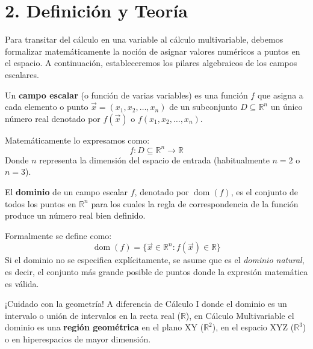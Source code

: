 \documentclass[11pt]{article}
\newenvironment{teoria}{%
  \section*{2. Definición y Teoría}%
}{}
\newenvironment{definicion}[1]{%
  \begin{tcolorbox}[colback=blue!5,colframe=blue!75!black,title=Definición: #1]%
}{%
  \end{tcolorbox}%
}
\newenvironment{alerta}[1]{%
  \begin{tcolorbox}[colback=yellow!10,colframe=orange!80!black,title=Alerta: #1]%
}{%
  \end{tcolorbox}%
}
\begin{document}
\begin{teoria}
  Para transitar del cálculo en una variable al cálculo multivariable, debemos formalizar matemáticamente la noción de asignar valores numéricos a puntos en el espacio. A continuación, estableceremos los pilares algebraicos de los campos escalares.

  \begin{definicion}{Campo Escalar}
    Un \textbf{campo escalar} (o función de varias variables) es una función $f$ que asigna a cada elemento o punto $\vec{x} = (x_1, x_2, \dots, x_n)$ de un subconjunto $D \subseteq \mathbb{R}^n$ un único número real denotado por $f(\vec{x})$ o $f(x_1, x_2, \dots, x_n)$.
    
    Matemáticamente lo expresamos como:
    $$ f \colon D \subseteq \mathbb{R}^n \to \mathbb{R} $$
    Donde $n$ representa la dimensión del espacio de entrada (habitualmente $n=2$ o $n=3$).
  \end{definicion}

  \begin{definicion}{Dominio de un Campo Escalar}
    El \textbf{dominio} de un campo escalar $f$, denotado por $\operatorname{dom}(f)$, es el conjunto de todos los puntos en $\mathbb{R}^n$ para los cuales la regla de correspondencia de la función produce un número real bien definido. 
    
    Formalmente se define como:
    $$ \operatorname{dom}(f) = \{ \vec{x} \in \mathbb{R}^n \colon f(\vec{x}) \in \mathbb{R} \} $$
    Si el dominio no se especifica explícitamente, se asume que es el \textit{dominio natural}, es decir, el conjunto más grande posible de puntos donde la expresión matemática es válida.
  \end{definicion}

  \begin{alerta}{Visualización del Dominio}
    ¡Cuidado con la geometría! A diferencia de Cálculo I donde el dominio es un intervalo o unión de intervalos en la recta real ($\mathbb{R}$), en Cálculo Multivariable el dominio es una \textbf{región geométrica} en el plano XY ($\mathbb{R}^2$), en el espacio XYZ ($\mathbb{R}^3$) o en hiperespacios de mayor dimensión.
  \end{alerta}


\end{teoria}
\end{document}
